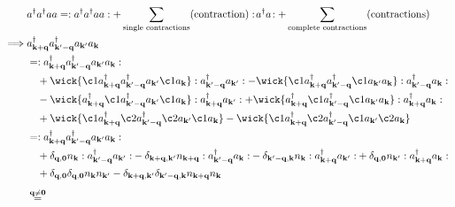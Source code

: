 \begin{align}
&a^\dagger a^\dagger a a
=
:a^\dagger a^\dagger a a:
+
\sum_{\text{single contractions}}
(\text{contraction})
:\!a^\dagger a\!:
+
\sum_{\text{complete contractions}}
(\text{contractions})
\\
\implies&
a_{\mathbf{k}+\mathbf q}^\dagger
a_{\mathbf{k}'-\mathbf q}^\dagger
a_{\mathbf k'}
a_{\mathbf k}\\
&=
:
a_{\mathbf{k}+\mathbf q}^\dagger
a_{\mathbf{k}'-\mathbf q}^\dagger
a_{\mathbf k'}
a_{\mathbf k}
:
\nonumber\\
&\quad
+
\wick{
\c1 a_{\mathbf{k}+\mathbf q}^\dagger
a_{\mathbf{k}'-\mathbf q}^\dagger
a_{\mathbf k'}
\c1 a_{\mathbf k}
}
:
a_{\mathbf{k}'-\mathbf q}^\dagger
a_{\mathbf k'}
:
-
\wick{
\c1 a_{\mathbf{k}+\mathbf q}^\dagger
a_{\mathbf{k}'-\mathbf q}^\dagger
\c1 a_{\mathbf k'}
a_{\mathbf k}
}
:
a_{\mathbf{k}'-\mathbf q}^\dagger
a_{\mathbf k}
:
\nonumber\\
&\quad
-
\wick{
a_{\mathbf{k}+\mathbf q}^\dagger
\c1 a_{\mathbf{k}'-\mathbf q}^\dagger
a_{\mathbf k'}
\c1 a_{\mathbf k}
}
:
a_{\mathbf{k}+\mathbf q}^\dagger
a_{\mathbf k'}
:
+
\wick{
a_{\mathbf{k}+\mathbf q}^\dagger
\c1 a_{\mathbf{k}'-\mathbf q}^\dagger
\c1 a_{\mathbf k'}
a_{\mathbf k}
}
:
a_{\mathbf{k}+\mathbf q}^\dagger
a_{\mathbf k}
:
\nonumber\\
&\quad
+
\wick{
\c1 a_{\mathbf{k}+\mathbf q}^\dagger
\c2 a_{\mathbf{k}'-\mathbf q}^\dagger
\c2 a_{\mathbf k'}
\c1 a_{\mathbf k}
}
-
\wick{
\c1 a_{\mathbf{k}+\mathbf q}^\dagger
\c2 a_{\mathbf{k}'-\mathbf q}^\dagger
\c1 a_{\mathbf k'}
\c2 a_{\mathbf k}
}
\\
&=
:
a_{\mathbf{k}+\mathbf q}^\dagger
a_{\mathbf{k}'-\mathbf q}^\dagger
a_{\mathbf k'}
a_{\mathbf k}
:
\nonumber\\
&\quad
+
{
\delta_{\mathbf q,\mathbf 0}
n_{\mathbf k}
:
a_{\mathbf{k}'-\mathbf q}^\dagger
a_{\mathbf k'}
:
}
-
{
\delta_{\mathbf{k}+\mathbf q,\mathbf k'}
n_{\mathbf{k}+\mathbf q}
:
a_{\mathbf{k}'-\mathbf q}^\dagger
a_{\mathbf k}
:
}
-
{
\delta_{\mathbf{k}'-\mathbf q,\mathbf k}
n_{\mathbf k}
:
a_{\mathbf{k}+\mathbf q}^\dagger
a_{\mathbf k'}
:
}
+
{
\delta_{\mathbf q,\mathbf 0}
n_{\mathbf k'}
:
a_{\mathbf{k}+\mathbf q}^\dagger
a_{\mathbf k}
:
}
\nonumber\\
&\quad
+
{
\delta_{\mathbf q,\mathbf 0}
\delta_{\mathbf q,\mathbf 0}
n_{\mathbf k}n_{\mathbf k'}
}
-
{
\delta_{\mathbf{k}+\mathbf q,\mathbf k'}
\delta_{\mathbf{k}'-\mathbf q,\mathbf k}
n_{\mathbf{k}+\mathbf q}n_{\mathbf k}
}
\\[1ex]
&\overset{\mathbf q\neq\mathbf 0}{=}

\end{align}

